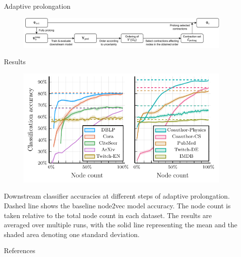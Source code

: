 \documentclass{beamer}
\newlength{\sepwidth}
\newlength{\colwidth}
\newcommand{\separatorcolumn}{\begin{column}{\sepwidth}\end{column}}
\begin{document}
\begin{frame}[t]
\begin{columns}[t]
\begin{column}{\colwidth}
		\begin{block}{Adaptive prolongation}
			\begin{figure}
				\includegraphics[width=\linewidth]{images/adaptive-prolongation/adaptive-prolongation.pdf}
			\end{figure}
		\end{block}

		\begin{block}{Results}
			\begin{figure}
				\includegraphics[width = \linewidth]{images/adaptive-coarsening/adaptive-coarsening.pdf}
			\end{figure}
			Downstream classifier accuracies at different steps of adaptive prolongation. Dashed line shows the baseline node2vec model accuracy. The node count is taken relative to the total node count in each dataset. The results are averaged over multiple runs, with the solid line representing the mean and the shaded area denoting one standard deviation.
		\end{block}

		\begin{block}{References}
			\printbibliography
		\end{block}
	\end{column}

	\separatorcolumn
\end{columns}

\end{frame}
\end{document}
